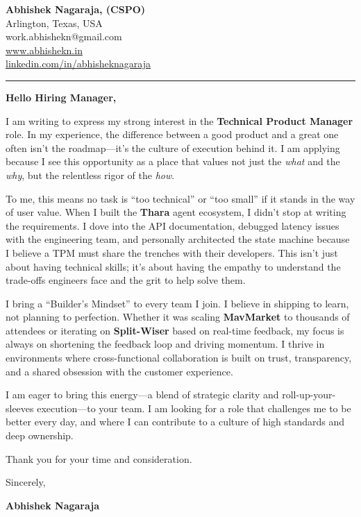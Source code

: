 \documentclass[
  11pt,
]{article}
\author{}
\date{}
\begin{document}
\textbf{Abhishek Nagaraja, (CSPO)}\\
Arlington, Texas, USA\\
work.abhishekn@gmail.com\\
\href{https://www.abhishekn.in}{www.abhishekn.in}\\
\href{https://linkedin.com/in/abhisheknagaraja}{linkedin.com/in/abhisheknagaraja}

\begin{center}\rule{0.5\linewidth}{0.5pt}\end{center}

\textbf{Hello Hiring Manager,}

I am writing to express my strong interest in the \textbf{Technical
Product Manager} role. In my experience, the difference between a good
product and a great one often isn't the roadmap---it's the culture of
execution behind it. I am applying because I see this opportunity as a
place that values not just the \emph{what} and the \emph{why}, but the
relentless rigor of the \emph{how}.

To me, this means no task is ``too technical'' or ``too small'' if it
stands in the way of user value. When I built the \textbf{Thara} agent
ecosystem, I didn't stop at writing the requirements. I dove into the
API documentation, debugged latency issues with the engineering team,
and personally architected the state machine because I believe a TPM
must share the trenches with their developers. This isn't just about
having technical skills; it's about having the empathy to understand the
trade-offs engineers face and the grit to help solve them.

I bring a ``Builder's Mindset'' to every team I join. I believe in
shipping to learn, not planning to perfection. Whether it was scaling
\textbf{MavMarket} to thousands of attendees or iterating on
\textbf{Split-Wiser} based on real-time feedback, my focus is always on
shortening the feedback loop and driving momentum. I thrive in
environments where cross-functional collaboration is built on trust,
transparency, and a shared obsession with the customer experience.

I am eager to bring this energy---a blend of strategic clarity and
roll-up-your-sleeves execution---to your team. I am looking for a role
that challenges me to be better every day, and where I can contribute to
a culture of high standards and deep ownership.

Thank you for your time and consideration.

Sincerely,

\textbf{Abhishek Nagaraja}
\end{document}
